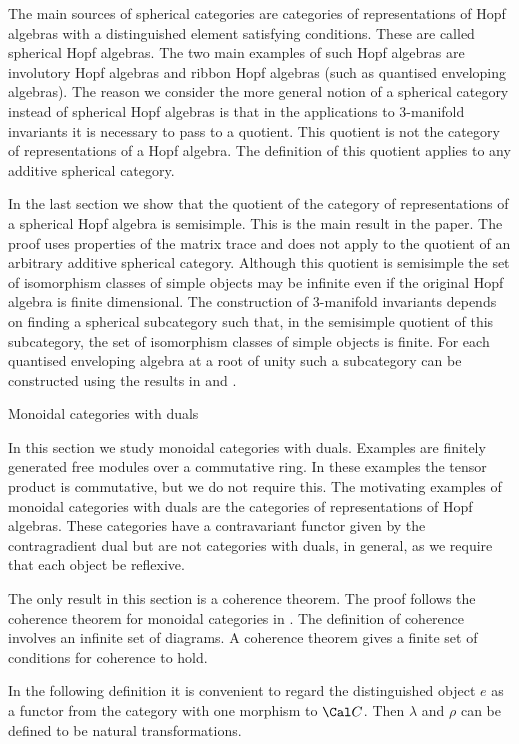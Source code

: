 The main sources of spherical categories are categories of representations
of Hopf algebras with a distinguished element satisfying conditions. These
are called spherical Hopf algebras. The two main examples of such Hopf
algebras are involutory Hopf algebras and ribbon Hopf algebras (such as
quantised enveloping algebras). The reason we consider the more general
notion of a spherical category instead of spherical Hopf algebras is that
in the applications to 3-manifold invariants it is necessary to pass to a
quotient. This quotient is not the category of representations of a Hopf
algebra. The definition of this quotient applies to any additive
spherical category. 

In the last section we show that the quotient of the category of 
representations of a spherical Hopf algebra is semisimple. This is the
main result in the paper. The proof uses properties of the matrix trace
and does not apply to the quotient of an arbitrary additive spherical
category. Although this quotient is semisimple the set of isomorphism
classes of simple objects may be infinite even if the original Hopf
algebra is finite dimensional. The construction of 3-manifold invariants
depends on finding a spherical subcategory such that, in the semisimple
quotient of this subcategory, the set of isomorphism classes of simple objects
is finite. For each quantised enveloping algebra at a root of unity such a
subcategory can be constructed using the results in \cite{Andersen  1992} and \cite{Andersen and Paradowski 1995}.


\head\headno Monoidal categories with duals \endhead

In this section we study monoidal categories with duals. Examples are
finitely generated free modules over a commutative ring. In these examples
the tensor product is commutative, but we do not require this. The
motivating examples of monoidal categories with duals are the categories
of representations of Hopf algebras. These categories have a contravariant
functor given by the contragradient dual but are not categories with duals,
in general, as we require that each object be reflexive.

The only result in this section is a coherence theorem. The proof follows
the coherence theorem for monoidal categories in \cite{MacLane  1963}.
The definition of coherence involves an infinite set of diagrams. A
coherence theorem gives a finite set of conditions for coherence to hold.

In the following definition it is convenient to regard the distinguished
object $e$ as a functor from the category with one morphism to $\Cal C$. 
Then $\lambda$ and $\rho$ can be defined to be natural transformations.

